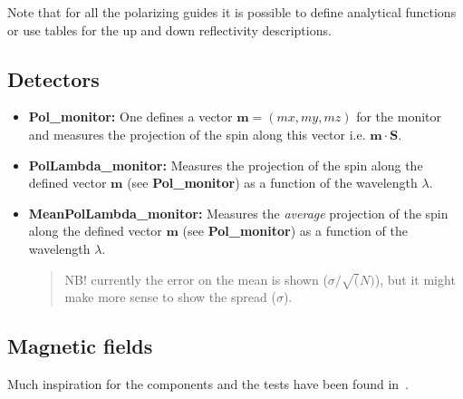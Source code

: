 Note that for all the polarizing guides it is possible to define analytical
functions or use tables for the up and down reflectivity descriptions.

\subsection{Detectors}

\begin{itemize}
\item \textbf{Pol\_monitor:} One defines a vector $\mathbf{m} = (mx,
  my, mz)$ for the monitor and measures the projection of the spin
  along this vector i.e. $\mathbf{m} \cdot \mathbf{S}$.\\
  
\item \textbf{PolLambda\_monitor:} Measures the projection of the
  spin along the defined vector $\mathbf{m}$ (see
  \textbf{Pol\_monitor}) as a function of the wavelength $\lambda$.
  
\item \textbf{MeanPolLambda\_monitor:} Measures the \emph{average}
  projection of the spin along the defined vector $\mathbf{m}$ (see
  \textbf{Pol\_monitor}) as a function of the wavelength $\lambda$.

  \begin{quote}
    NB! currently the error on the mean is shown ($\sigma/\sqrt(N)$), but it
    might make more sense to show the spread ($\sigma$).
  \end{quote}
\end{itemize}

\subsection{Magnetic fields}

Much inspiration for the components and the tests have been found
in~\cite{pol_seeger}.

